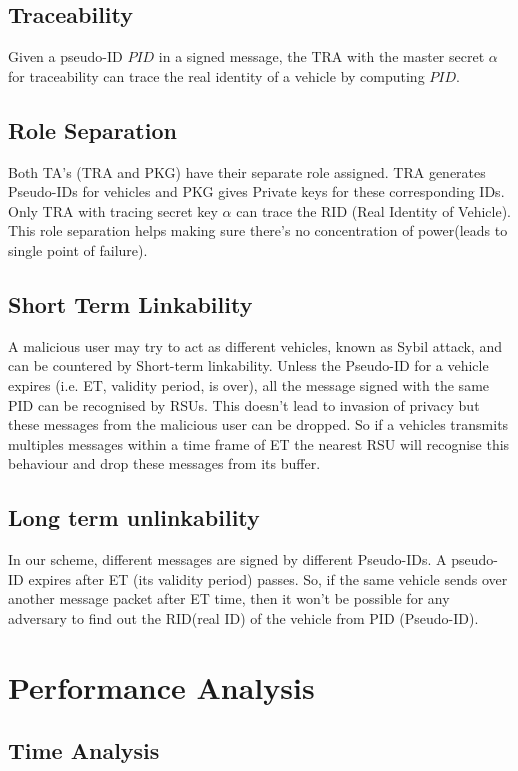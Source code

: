 \documentclass[10pt,journal,letterpaper]{IEEEtran}
\begin{document}
\subsection{Traceability}
Given a pseudo-ID $PID$ in a signed message, the TRA with the master
secret $\alpha$ for traceability can trace the real identity of a
vehicle by computing $PID$.

\subsection{Role Separation}
Both TA’s (TRA and PKG) have their separate role assigned. TRA
generates Pseudo-IDs for vehicles and PKG gives Private keys for
these corresponding IDs. Only TRA with tracing secret key $\alpha$
can trace the RID (Real Identity of Vehicle). This role separation
helps making sure there’s no concentration of power(leads to
single point of failure).

\subsection{Short Term Linkability}
A malicious user may try to act as different vehicles, known as
Sybil\cite{r4} attack, and can be countered by Short-term
linkability. Unless the Pseudo-ID for a vehicle expires (i.e. ET,
validity period, is over), all the message signed with the same PID
can be recognised by RSUs. This doesn't lead to invasion of privacy
but these messages from the malicious user can be dropped. So if a
vehicles transmits multiples messages within a time frame of ET the
nearest RSU will recognise this behaviour and drop these messages
from its buffer.

\subsection{Long term unlinkability}
In our scheme, different messages are signed by different
Pseudo-IDs. A pseudo-ID expires after ET (its validity period)
passes. So, if the same vehicle sends over another message packet
after ET time, then it won’t be possible for any adversary to find
out the RID(real ID) of the vehicle from PID (Pseudo-ID).




\section{Performance Analysis}
\label{L7}

\subsection{Time Analysis}
\label{L72}
\end{document}
